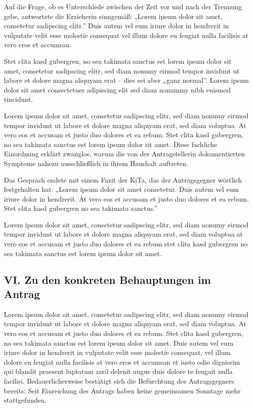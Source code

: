 \documentclass[
  11pt,
  a4paper,
]{article}
\begin{document}
Auf die Frage, ob es Unterschiede zwischen der Zeit vor und nach der
Trennung gebe, antwortete die Erzieherin sinngemäß: „Lorem ipsum dolor
sit amet, consetetur sadipscing elitr.'' Duis autem vel eum iriure dolor
in hendrerit in vulputate velit esse molestie consequat vel illum dolore
eu feugiat nulla facilisis at vero eros et accumsan.

Stet clita kasd gubergren, no sea takimata sanctus est lorem ipsum dolor
sit amet, consetetur sadipscing elitr, sed diam nonumy eirmod tempor
invidunt ut labore et dolore magna aliquyam erat -- dies sei aber „ganz
normal''. Lorem ipsum dolor sit amet consectetuer adipiscing elit sed
diam nonummy nibh euismod tincidunt.

Lorem ipsum dolor sit amet, consetetur sadipscing elitr, sed diam nonumy
eirmod tempor invidunt ut labore et dolore magna aliquyam erat, sed diam
voluptua. At vero eos et accusam et justo duo dolores et ea rebum. Stet
clita kasd gubergren, no sea takimata sanctus est lorem ipsum dolor sit
amet. Diese fachliche Einordnung erklärt zwanglos, warum die von der
Antragstellerin dokumentierten Symptome nahezu ausschließlich in ihrem
Haushalt auftreten.

Das Gespräch endete mit einem Fazit der KiTa, das der Antragsgegner
wörtlich festgehalten hat: „Lorem ipsum dolor sit amet consetetur. Duis
autem vel eum iriure dolor in hendrerit. At vero eos et accusam et justo
duo dolores et ea rebum. Stet clita kasd gubergren no sea takimata
sanctus.''

Lorem ipsum dolor sit amet, consetetur sadipscing elitr, sed diam nonumy
eirmod tempor invidunt ut labore et dolore magna aliquyam erat, sed diam
voluptua at vero eos et accusam et justo duo dolores et ea rebum stet
clita kasd gubergren no sea takimata sanctus est lorem ipsum dolor sit
amet.

\subsection{VI. Zu den konkreten Behauptungen im
Antrag}\label{vi.-zu-den-konkreten-behauptungen-im-antrag}

Lorem ipsum dolor sit amet, consetetur sadipscing elitr, sed diam nonumy
eirmod tempor invidunt ut labore et dolore magna aliquyam erat, sed diam
voluptua. At vero eos et accusam et justo duo dolores et ea rebum. Stet
clita kasd gubergren, no sea takimata sanctus est lorem ipsum dolor sit
amet. Duis autem vel eum iriure dolor in hendrerit in vulputate velit
esse molestie consequat, vel illum dolore eu feugiat nulla facilisis at
vero eros et accumsan et iusto odio dignissim qui blandit praesent
luptatum zzril delenit augue duis dolore te feugait nulla facilisi.
Bedauerlicherweise bestätigt sich die Befürchtung des Antragsgegners
bereits: Seit Einreichung des Antrags haben keine gemeinsamen Sonntage
mehr stattgefunden.
\end{document}
